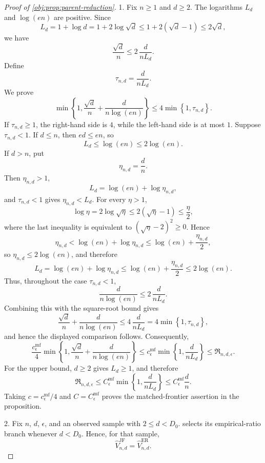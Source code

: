 \begin{proof}[Proof of \cref{obj:prop:parent-reduction}]
1. Fix \(n\ge1\) and \(d\ge2\). The logarithms \(L_d\) and \(\log(en)\) are positive. Since
\[
L_d
=
1+\log d
=
1+2\log\sqrt d
\le
1+2(\sqrt d-1)
\le
2\sqrt d,
\]
we have
\[
\frac{\sqrt d}{n}
\le
2\,\frac{d}{nL_d}.
\]
Define
\[
\tau_{n,d}=\frac{d}{nL_d}.
\]
We prove
\[
\min\left\{1,\frac{\sqrt d}{n}+\frac{d}{n\log(en)}\right\}
\le
4\min\left\{1,\tau_{n,d}\right\}.
\]
If \(\tau_{n,d}\ge1\), the right-hand side is \(4\), while the left-hand side is at most \(1\).
Suppose \(\tau_{n,d}<1\). If \(d\le n\), then \(ed\le en\), so
\[
L_d\le \log(en)\le 2\log(en).
\]
If \(d>n\), put
\[
\eta_{n,d}=\frac dn .
\]
Then \(\eta_{n,d}>1\),
\[
L_d=\log(en)+\log\eta_{n,d},
\]
and \(\tau_{n,d}<1\) gives \(\eta_{n,d}<L_d\). For every \(\eta>1\),
\[
\log\eta
=
2\log\sqrt\eta
\le
2(\sqrt\eta-1)
\le
\frac{\eta}{2},
\]
where the last inequality is equivalent to \((\sqrt\eta-2)^2\ge0\). Hence
\[
\eta_{n,d}
<
\log(en)+\log\eta_{n,d}
\le
\log(en)+\frac{\eta_{n,d}}2,
\]
so \(\eta_{n,d}\le2\log(en)\), and therefore
\[
L_d
=
\log(en)+\log\eta_{n,d}
\le
\log(en)+\frac{\eta_{n,d}}2
\le
2\log(en).
\]
Thus, throughout the case \(\tau_{n,d}<1\),
\[
\frac{d}{n\log(en)}
\le
2\,\frac{d}{nL_d}.
\]
Combining this with the square-root bound gives
\[
\frac{\sqrt d}{n}+\frac{d}{n\log(en)}
\le
4\,\frac{d}{nL_d}
=
4\min\left\{1,\tau_{n,d}\right\},
\]
and hence the displayed comparison follows. Consequently,
\[
\frac{c_\epsilon^{\mathrm{mf}}}{4}
\min\left\{1,\frac{\sqrt d}{n}+\frac{d}{n\log(en)}\right\}
\le
c_\epsilon^{\mathrm{mf}}
\min\left\{1,\frac{d}{nL_d}\right\}
\le
\mathfrak R_{n,d,\epsilon}.
\]
For the upper bound, \(d\ge2\) gives \(L_d\ge1\), and therefore
\[
\mathfrak R_{n,d,\epsilon}
\le
C_\epsilon^{\mathrm{mf}}
\min\left\{1,\frac{d}{nL_d}\right\}
\le
C_\epsilon^{\mathrm{mf}}\frac dn .
\]
Taking \(c=c_\epsilon^{\mathrm{mf}}/4\) and \(C=C_\epsilon^{\mathrm{mf}}\) proves the matched-frontier assertion in the proposition. %

2. Fix \(n\), \(d\), \(\epsilon\), and an observed sample with \(2\le d<D_0\).  selects its empirical-ratio branch whenever \(d<D_0\). Hence, for that sample,
\[
\widehat V_{n,d}^{\mathrm{JF}}
=
\widehat V_{n,d}^{\mathrm{ER}} .
\]


\end{proof}
